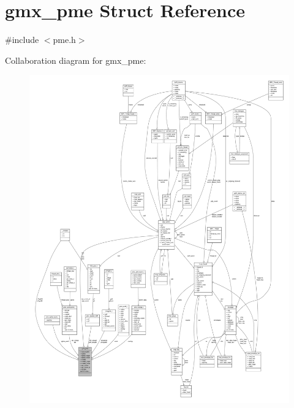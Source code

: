 \hypertarget{structgmx__pme}{\section{gmx\-\_\-pme \-Struct \-Reference}
\label{structgmx__pme}
}


{\ttfamily \#include $<$pme.\-h$>$}



\-Collaboration diagram for gmx\-\_\-pme\-:
\nopagebreak
\begin{figure}[H]
\begin{center}
\leavevmode
\includegraphics[width=350pt]{structgmx__pme__coll__graph}
\end{center}
\end{figure}
